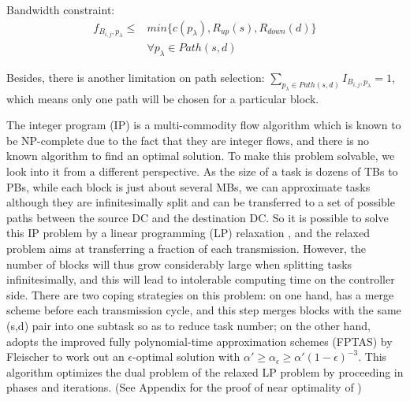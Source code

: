 Bandwidth constraint:
\begin{equation}
\begin{split}
f_{B_{i,j},p_\lambda} \leq & min \{c(p_\lambda),R_{up}(s),R_{down}(d)\}\\
& \forall p_\lambda \in Path(s,d) \label{st:bottleneck}
\end{split}
\end{equation}

Besides, there is another limitation on path selection: $\displaystyle{\sum_{p_\lambda \in Path(s,d)}} I_{B_{i,j},p_\lambda} = 1$, which means only one path will be chosen for a particular block.

The integer program (IP) is a multi-commodity flow algorithm which is known to be NP-complete \cite{garg1997primal} due to the fact that they are integer flows, and there is no known algorithm to find an optimal solution. To make this problem solvable, we look into it from a different perspective. As the size of a task is dozens of TBs to PBs, while each block is just about several MBs, we can approximate tasks although they are infinitesimally split and can be transferred to a set of possible paths between the source DC and the destination DC. So it is possible to solve this IP problem by a linear programming (LP) relaxation \cite{garg2007faster,reed2012traffic}, and the relaxed problem aims at transferring a fraction of each transmission. However, the number of blocks will thus grow considerably large when splitting tasks infinitesimally, and this will lead to intolerable computing time on the controller side. There are two coping strategies on this problem: on one hand, \name has a merge scheme before each transmission cycle, and this step merges blocks with the same (s,d) pair into one subtask so as to reduce task number; on the other hand, \name adopts the improved fully polynomial-time approximation schemes (FPTAS) by Fleischer \cite{fleischer2000approximating} to work out an $\epsilon$-optimal solution with $\alpha' \geq \alpha_\epsilon \geq \alpha'(1-\epsilon)^{-3}$. This algorithm optimizes the dual problem of the relaxed LP problem by proceeding in phases and iterations. (See Appendix for the proof of near optimality of \name)
